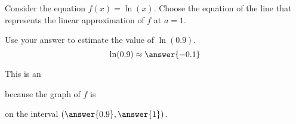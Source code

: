 \documentclass{ximera}
\author{Nela Lakos \and Kyle Parsons \and Bobby Ramsey}
\begin{document}
\begin{exercise}

Consider the equation $f(x) = \ln(x)$.  Choose the equation of the line that represents the linear approximation of $f$ at $a=1$.
\begin{multipleChoice}
\end{multipleChoice}

Use your answer to estimate the value of $\ln(0.9)$.
\[ \ln(0.9) \approx \answer{-0.1} \]

This is an
\begin{multipleChoice}
\end{multipleChoice}
because the graph of $f$ is 
\begin{multipleChoice}
\end{multipleChoice}
on the interval $\left( \answer{0.9}, \answer{1} \right)$.

\end{exercise}
\end{document}
